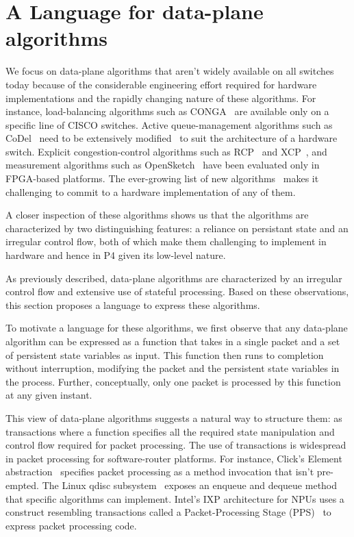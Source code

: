 \section{A Language for data-plane algorithms}
\label{s:language}
 We focus on data-plane algorithms that aren't widely
available on all switches today because of the
considerable engineering effort required for hardware
implementations and the rapidly changing nature of these
algorithms. For instance, load-balancing algorithms such
as CONGA~\cite{conga} are available only on a specific
line of CISCO switches.  Active queue-management
algorithms such as CoDel~\cite{codel} need to be
extensively modified~\cite{pie} to suit the architecture
of a hardware switch.  Explicit congestion-control
algorithms such as RCP~\cite{rcp} and XCP~\cite{xcp}, and
measurement algorithms such as
OpenSketch~\cite{opensketch} have been evaluated only in
FPGA-based platforms.  The ever-growing list of new
algorithms~\cite{pdq, d3, detail} makes it challenging to
commit to a hardware implementation of any of them.

 A closer inspection of these
algorithms shows us that the algorithms are characterized by two distinguishing
features: a reliance on persistant state and an irregular control flow, both of
which make them challenging to implement in hardware and hence in P4 given its
low-level nature.

As previously described, data-plane algorithms are characterized by an
irregular control flow and extensive use of stateful processing. Based on these
observations, this section proposes a language to express these algorithms.

To motivate a language for these algorithms, we first observe that any
data-plane algorithm can be expressed as a function that takes in a single
packet and a set of persistent state variables as input. This function then
runs to completion without interruption, modifying the packet and the
persistent state variables in the process. Further, conceptually, only one
packet is processed by this function at any given instant.

This view of data-plane algorithms suggests a natural way to structure them: as
transactions where a function specifies all the required state manipulation and
control flow required for packet processing. The use of transactions is
widespread in packet processing for software-router platforms. For instance,
Click's Element abstraction~\cite{kohler_thesis} specifies packet processing as
a method invocation that isn't pre-empted.  The Linux qdisc
subsystem~\cite{qdisc} exposes an enqueue and dequeue method that specific
algorithms can implement. Intel's IXP architecture for NPUs uses a construct
resembling transactions called a Packet-Processing Stage
(PPS)~\cite{intel_pldi} to express packet processing code.

